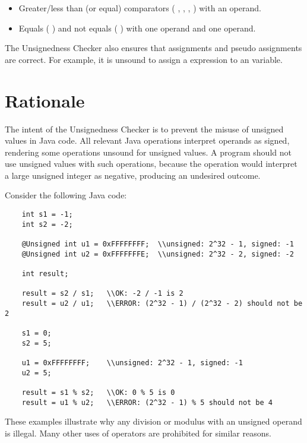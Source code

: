 \begin{itemize}

    \item   
    Greater/less than (or equal) comparators
    ( \code{<}, \code{<=}, \code{>}, \code{>=} ) with an operand.
    \item   
    Equals ( \code{==} ) and not equals ( \code{!=} ) with one 
    operand and one  operand.

\end{itemize}

The Unsignedness Checker also ensures that assignments and pseudo assignments are
correct. For example, it is unsound to assign a  expression to an
 variable.

\section{Rationale\label{unsignedness-checker-rationale}}

The intent of the Unsignedness Checker is to prevent the misuse of unsigned
values in Java code. All relevant Java operations interpret operands as signed,
rendering some operations unsound for unsigned values. A program should not use
unsigned values with such operations, because the operation would interpret a
large unsigned integer as negative, producing an undesired outcome.

Consider the following Java code:

\begin{Verbatim}
    int s1 = -1;
    int s2 = -2;

    @Unsigned int u1 = 0xFFFFFFFF;  \\unsigned: 2^32 - 1, signed: -1
    @Unsigned int u2 = 0xFFFFFFFE;  \\unsigned: 2^32 - 2, signed: -2

    int result;

    result = s2 / s1;   \\OK: -2 / -1 is 2
    result = u2 / u1;   \\ERROR: (2^32 - 1) / (2^32 - 2) should not be 2

    s1 = 0;
    s2 = 5;

    u1 = 0xFFFFFFFF;    \\unsigned: 2^32 - 1, signed: -1
    u2 = 5;

    result = s1 % s2;   \\OK: 0 % 5 is 0
    result = u1 % u2;   \\ERROR: (2^32 - 1) % 5 should not be 4
\end{Verbatim}

These examples illustrate why any division or modulus with an unsigned operand 
is illegal. Many other uses of operators are prohibited for similar reasons.